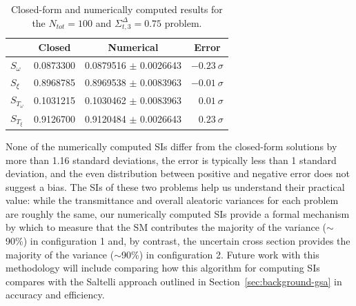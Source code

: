 \begin{table}[htb]
    \centering
    \caption{Closed-form and numerically computed results for the $N_{tot}=100$ and $\Sigma_{t,3}^\Delta=0.75$ problem.}
    \begin{tabular}{|l||c|c|r|}\hline
    & \multicolumn{1}{|c|}{Closed} & Numerical & \multicolumn{1}{|c|}{Error}   \\ \hline \hline\hline \hline
    $S_\omega$          & 0.0873300 & 0.0879516 $\pm$ 0.0026643 & $-0.23~\sigma$  \\
    $S_\xi$             & 0.8968785 & 0.8969538 $\pm$ 0.0083963 & $-0.01~\sigma$ \\ \hline
    $S_{T_\omega}$      & 0.1031215 & 0.1030462 $\pm$ 0.0083963 & $0.01~\sigma$ \\
    $S_{T_\xi}$         & 0.9126700 & 0.9120484 $\pm$ 0.0026643 & $0.23~\sigma$ \\
    \hline
    \end{tabular}
\label{tab:pbm2}
\end{table}

None of the numerically computed SIs differ from the closed-form solutions by more than 1.16 standard deviations, the error is typically less than 1 standard deviation, and the even distribution between positive and negative error does not suggest a bias. The SIs of these two problems help us understand their practical value: while the transmittance and overall aleatoric variances for each problem are roughly the same, our numerically computed SIs provide a formal mechanism by which to measure that the SM contributes the majority of the variance ($\sim$90\%) in configuration 1 and, by contrast, the uncertain cross section provides the majority of the variance ($\sim$90\%) in configuration 2. Future work with this methodology will include comparing how this algorithm for computing SIs compares with the Saltelli approach outlined in Section~\ref{sec:background-gsa} in accuracy and efficiency.

